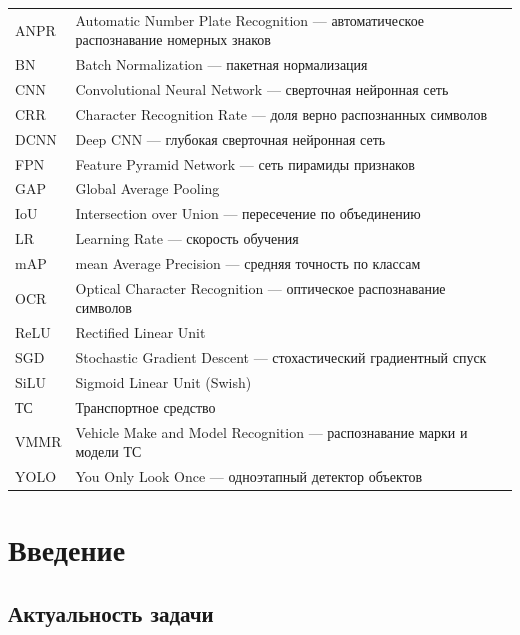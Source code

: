 \documentclass[10pt,a4paper]{report}
\numberwithin{equation}{chapter}
\numberwithin{figure}{chapter}
\numberwithin{table}{chapter}
\begin{document}
\begin{tabular}{@{}lp{}@{}}
ANPR      & Automatic Number Plate Recognition --- автоматическое распознавание номерных знаков \\[4pt]
BN        & Batch Normalization --- пакетная нормализация \\[4pt]
CNN       & Convolutional Neural Network --- сверточная нейронная сеть \\[4pt]
CRR       & Character Recognition Rate --- доля верно распознанных символов \\[4pt]
DCNN      & Deep CNN --- глубокая сверточная нейронная сеть \\[4pt]
FPN       & Feature Pyramid Network --- сеть пирамиды признаков \\[4pt]
GAP       & Global Average Pooling \\[4pt]
IoU       & Intersection over Union --- пересечение по объединению \\[4pt]
LR        & Learning Rate --- скорость обучения \\[4pt]
mAP       & mean Average Precision --- средняя точность по классам \\[4pt]
OCR       & Optical Character Recognition --- оптическое распознавание символов \\[4pt]
ReLU      & Rectified Linear Unit \\[4pt]
SGD       & Stochastic Gradient Descent --- стохастический градиентный спуск \\[4pt]
SiLU      & Sigmoid Linear Unit (Swish) \\[4pt]
ТС        & Транспортное средство \\[4pt]
VMMR      & Vehicle Make and Model Recognition --- распознавание марки и модели ТС \\[4pt]
YOLO      & You Only Look Once --- одноэтапный детектор объектов \\
\end{tabular}

\chapter*{Введение}

\section*{Актуальность задачи}
\end{document}
